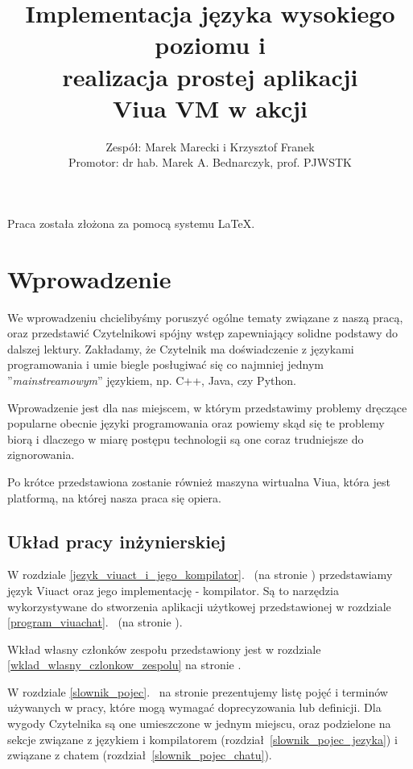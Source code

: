 \documentclass[11pt,oneside,a4paper,titlepage,onecolumn]{book}
\author{Zespół: Marek Marecki i Krzysztof Franek\\Promotor: dr hab. Marek A. Bednarczyk, prof. PJWSTK}
\title{%
    Implementacja języka wysokiego poziomu i \\
    realizacja prostej aplikacji \\
    \large Viua VM w akcji}
\begin{document}

\maketitle

\tableofcontents
\listoffigures

Praca została złożona za pomocą systemu \LaTeX.

\newpage

\chapter{Wprowadzenie}

We wprowadzeniu chcielibyśmy poruszyć ogólne tematy związane z naszą pracą, oraz przedstawić Czytelnikowi
spójny wstęp zapewniający solidne podstawy do dalszej lektury. Zakładamy, że Czytelnik ma doświadczenie z
językami programowania i umie biegle posługiwać się co najmniej jednym ''\emph{mainstreamowym}'' językiem, np.
C++, Java, czy Python.

Wprowadzenie jest dla nas miejscem, w którym przedstawimy problemy dręczące popularne obecnie języki
programowania oraz powiemy skąd się te problemy biorą i dlaczego w miarę postępu technologii są one coraz
trudniejsze do zignorowania.

Po krótce przedstawiona zostanie również maszyna wirtualna Viua, która jest platformą, na której nasza praca
się opiera.

\section{Układ pracy inżynierskiej}

W rozdziale \ref{jezyk_viuact_i_jego_kompilator}.~ (na stronie
\pageref{jezyk_viuact_i_jego_kompilator}) przedstawiamy język Viuact oraz jego implementację - kompilator.
Są to narzędzia wykorzystywane do stworzenia aplikacji użytkowej przedstawionej w rozdziale
\ref{program_viuachat}.~ (na stronie \pageref{program_viuachat}).

Wkład własny członków zespołu przedstawiony jest w rozdziale \ref{wklad_wlasny_czlonkow_zespolu} na stronie
\pageref{wklad_wlasny_czlonkow_zespolu}.

W rozdziale \ref{slownik_pojec}.~ na stronie \pageref{slownik_pojec} prezentujemy listę
pojęć i terminów używanych w pracy, które mogą wymagać doprecyzowania lub definicji. Dla wygody Czytelnika są
one umieszczone w jednym miejscu, oraz podzielone na sekcje związane z językiem i kompilatorem
(rozdział~\ref{slownik_pojec_jezyka}) i związane z chatem (rozdział~\ref{slownik_pojec_chatu}).
\end{document}

